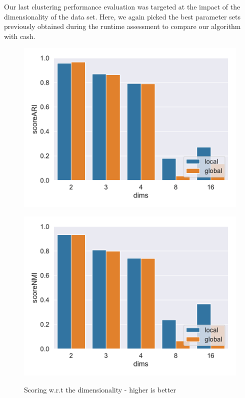 Our last clustering performance evaluation was targeted at the impact of the dimensionality of the data set. Here, we again picked the best parameter sets previously obtained during the runtime assessment to compare our algorithm with \gls{cash}.
\begin{figure}[h]
    \centering
    \begin{minipage}[t]{.5\textwidth}
      \centering  
      \captionsetup{width=.9\linewidth}
      \includegraphics[width=\textwidth]{evaluation/per_dims/Best_ARI_O10000_N5_pdims_bar.pdf}
      \label{fig:ariperpts}
    \end{minipage}%
    \begin{minipage}[t]{.5\textwidth}
      \centering
      \captionsetup{width=.9\linewidth}
      \includegraphics[width=\textwidth]{evaluation/per_dims/Best_NMI_O10000_N5_pdims_bar.pdf}
      \label{fig:nmiperpts}
    \end{minipage}
    \caption{Scoring w.r.t the dimensionality - higher is better}
    \label{fig:scoreperdims}
\end{figure}

